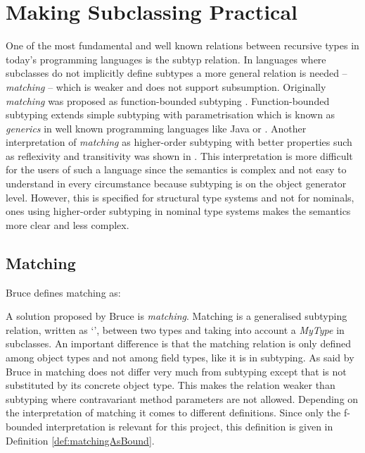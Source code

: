 \section{Making Subclassing Practical}
\label{ctr:makingSubclassingPractical}
One of the most fundamental and well known relations between recursive
types in today's programming languages is the subtyp relation.
In languages
where subclasses do not implicitly define subtypes a more general
relation is needed -- \emph{matching} -- which is weaker and does
not support subsumption. Originally \emph{matching} was proposed as
function-bounded subtyping \cite{canning_f-bounded_1989}. Function-bounded
subtyping extends simple subtyping with parametrisation which is
known as \emph{generics} in well known programming languages
like Java or \cs \cite{barron-estrada_inheritance_2003}. Another
interpretation of \emph{matching} as higher-order subtyping with
better properties such as reflexivity and transitivity was shown in
\cite{abadi_subtyping_1996}. This interpretation is more
difficult for the users of such a language since the semantics is complex
and not easy to understand in every circumstance because subtyping is
on the object generator level. However, this is specified for structural
type systems and not for nominals, ones using higher-order subtyping
in nominal type systems makes the semantics more clear and less complex.

\subsection{Matching}
\label{subsec:matching}
\begin{prop}[Matching]
	\label{prop:matching}
	Bruce defines matching as:
\end{prop}

A solution proposed by Bruce \cite{bruce_binary_1995} is
\emph{matching}. Matching is a generalised subtyping relation, written
as `\match', between two types and taking into account a \emph{MyType}
in subclasses. An important difference is that the matching relation
is only defined among object types and not among field types, like
it is in subtyping. As said by Bruce in \cite{bruce_foundations_2002}
matching does not differ very much from subtyping except that \mytype
is not substituted by its concrete object type. This makes the relation
weaker than subtyping where contravariant method parameters are not
allowed. Depending on the interpretation of matching it comes to different
definitions. Since only the f-bounded interpretation is relevant for this
project, this definition is given in Definition \ref{def:matchingAsBound}.

